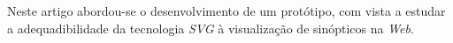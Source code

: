 \documentclass[twocolumn,twoside,11pt]{article}
\newcommand{\class}[1]{{\normalfont\slshape #1\/}}
\newcommand{\svg}{\class{SVG}}
\begin{document}
Neste artigo abordou-se o desenvolvimento de um protótipo, com vista a
estudar a adequadibilidade da tecnologia \svg{} à visualização de
sinópticos na \textit{Web}.

\lipsum[8]


\renewcommand{\bibname}{Referências}
%
%

%


\end{document}
